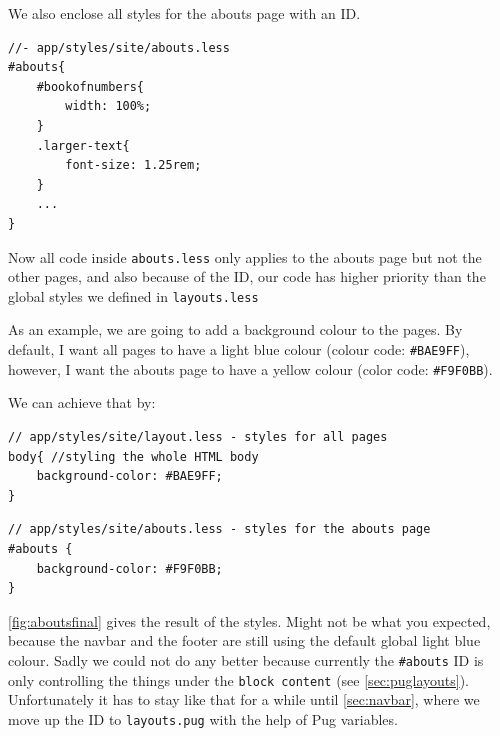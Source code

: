 We also enclose all styles for the abouts page with an ID.

\begin{lstlisting}[language=pug]
//- app/styles/site/abouts.less
#abouts{
    #bookofnumbers{
        width: 100%;
    }
    .larger-text{
        font-size: 1.25rem;
    }
    ...
}
\end{lstlisting}

Now all code inside \texttt{abouts.less} only applies to the abouts page but not the other pages, and also because of the ID, our code has higher priority than the global styles we defined in \texttt{layouts.less}

As an example, we are going to add a background colour to the pages. By default, I want all pages to have a light blue colour (colour code: \texttt{\#BAE9FF}), however, I want the abouts page to have a yellow colour (color code: \texttt{\#F9F0BB}).

We can achieve that by:

\begin{lstlisting}[language=pug]
// app/styles/site/layout.less - styles for all pages
body{ //styling the whole HTML body
    background-color: #BAE9FF;
}
\end{lstlisting}

\begin{lstlisting}[language=pug]
// app/styles/site/abouts.less - styles for the abouts page
#abouts {
    background-color: #F9F0BB;
}
\end{lstlisting}

\cref{fig:aboutsfinal} gives the result of the styles. Might not be what you expected, because the navbar and the footer are still using the default global light blue colour. Sadly we could not do any better because currently the \texttt{\#abouts} ID is only controlling the things under the \texttt{block content} (see \cref{sec:puglayouts}). Unfortunately it has to stay like that for a while until \cref{sec:navbar}, where we move up the ID to \texttt{layouts.pug} with the help of Pug variables.

